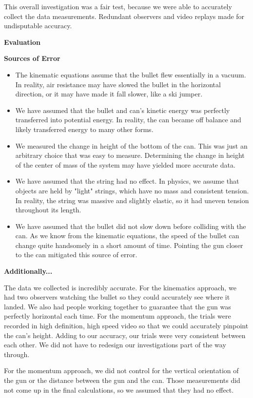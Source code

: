 \documentclass[12pt]{article}
\newcommand{\double}[0]{\par\null\par}
\newcommand{\bigheader}[1]{\LARGE\textbf{#1}\normalsize}
\newcommand{\header}[1]{\large\textbf{#1}\normalsize}
\begin{document}
This overall investigation was a fair test, because we were able to accurately collect the data measurements. Redundant
observers and video replays made for undisputable accuracy.\double

\double\bigheader{Evaluation}

\header{Sources of Error}
\begin{itemize}
\item The kinematic equations assume that the bullet flew essentially in a vacuum. In reality, air resistance may have slowed the
bullet in the horizontal direction, or it may have made it fall slower, like a ski jumper.
\item We have assumed that the bullet and can's kinetic energy was perfectly transferred into potential energy. In reality, the
can became off balance and likely transferred energy to many other forms.
\item We measured the change in height of the bottom of the can. This was just an arbitrary choice that was easy to measure.
Determining the change in height of the center of mass of the system may have yielded more accurate data.
\item We have assumed that the string had no effect. In physics, we assume that objects are held by "light" strings, which have
no mass and consistent tension. In reality, the string was massive and slightly elastic, so it had uneven tension throughout its
length.
\item We have assumed that the bullet did not slow down before colliding with the can. As we know from the kinematic equations,
the speed of the bullet can change quite handsomely in a short amount of time. Pointing the gun closer to the can mitigated this 
source of error.
\end{itemize}

\double\header{Additionally...}

The data we collected is incredibly accurate. For the kinematics approach, we had two observers watching the bullet so
they could accurately see where it landed. We also had people working together to guarantee that the gun was perfectly
horizontal each time. For the momentum approach, the trials were recorded in high definition, high speed video so that we could
accurately pinpoint the can's height. Adding to our accuracy, our trials were very consistent between each other. We did not
have to redesign our investigations part of the way through.\double

For the momentum approach, we did not control for the vertical orientation of the gun or the distance between the gun and the
can. Those measurements did not come up in the final calculations, so we assumed that they had no effect.\double
\end{document}
